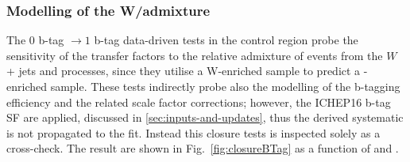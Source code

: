 \subsubsection*{Modelling of the W/\ttbar admixture}
\label{sec:tfSyst_WttAd}
The $0$ b-tag $\rightarrow1$ b-tag data-driven tests in the \mj control region 
probe the sensitivity of the transfer factors to the relative
admixture of events from the $W$ + jets and \ttbar processes, 
since they utilise a W-enriched sample to predict a \ttbar-enriched sample. 
These tests indirectly probe also the modelling of the b-tagging
efficiency and the related scale factor corrections;
however, the ICHEP16 b-tag SF are applied, discussed in \ref{sec:inputs-and-updates},
thus the derived systematic is not propagated to the fit. Instead this
closure tests is inspected solely as a cross-check. 
The result are shown in Fig.~\ref{fig:closureBTag} as a function of \scalht and \njet. 

